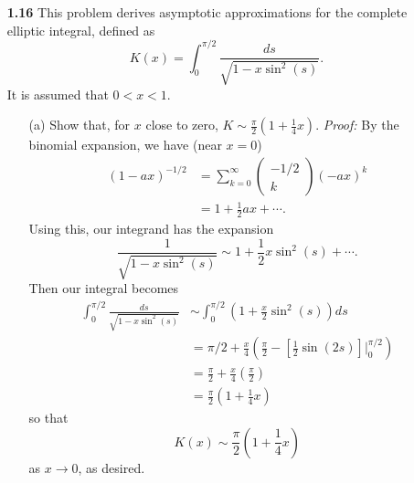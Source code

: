 \documentclass{article}
\begin{document}
\begin{itemize}
\begin{itemize}
    \end{itemize}   

    \pagebreak


    \item[\textbf{1.16}] This problem derives asymptotic approximations for the complete elliptic integral, defined as
    \[K(x) = \int_0^{\pi/2}\frac{ds}{\sqrt{1 - x\sin^2(s)}}.\]
    It is assumed that $0 < x < 1$.
    \begin{itemize}
        \item[(a)] Show that, for $x$ close to zero, $K \sim \frac{\pi}{2}(1 + \frac{1}{4}x).$
        \newline\newline
        \textit{Proof:} By the binomial expansion, we have (near $x = 0$)
        \begin{align*}
            (1 - ax)^{-1/2} &= \sum_{k = 0}^{\infty} \begin{pmatrix}
                -1/2\\
                k
            \end{pmatrix}(-ax)^k\\
            &= 1 + \frac{1}{2}ax + \cdots.
        \end{align*}
        Using this, our integrand has the expansion 
        \[\frac{1}{\sqrt{1 - x\sin^2(s)}} \sim 1 + \frac{1}{2}x\sin^2(s) + \cdots.\]
        Then our integral becomes
        \begin{align*}
            \int_0^{\pi/2}\frac{ds}{\sqrt{1 - x\sin^2(s)}} &\sim \int_0^{\pi/2} \left(1 + \frac{x}{2}\sin^2(s)\right)ds\\
            &= \pi/2 + \frac{x}{4}\left(\frac{\pi}{2} - \left[\frac{1}{2}\sin(2s)\right]\bigg|_0^{\pi/2}\right)\\
            &= \frac{\pi}{2} + \frac{x}{4}\left(\frac{\pi}{2}\right)\\
            &= \frac{\pi}{2}\left(1 + \frac{1}{4}x\right)
        \end{align*}
        so that 
        \[K(x) \sim \frac{\pi}{2}\left(1 + \frac{1}{4}x\right)\]
        as $x \to 0$, as desired.
        \newline\newline
        
        


\end{itemize}
\end{itemize}
\end{document}
